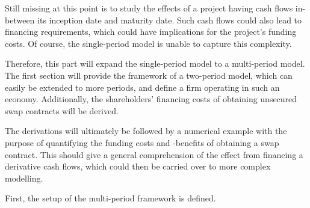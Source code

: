 \documentclass[main.tex]{subfiles}
\begin{document}
    Still missing at this point is to study the effects of a project
    having cash flows in-between its inception date and maturity date.
    Such cash flows could also lead to financing requirements,
    which could have implications for the project's funding costs.
    Of course, the single-period model is unable to capture this complexity.

    Therefore, this part will expand the single-period model to a multi-period model.
    The first section will provide the framework of a two-period model, 
    which can easily be extended to more periods,
    and define a firm operating in such an economy.
    Additionally, the shareholders' financing costs 
    of obtaining unsecured swap contracts will be derived.

    The derivations will ultimately be followed by a numerical example
    with the purpose of quantifying the funding costs and -benefits of obtaining a swap contract.
    This should give a general comprehension of the effect from financing a derivative cash flows,
    which could then be carried over to more complex modelling.

    First, the setup of the multi-period framework is defined.
\end{document}
